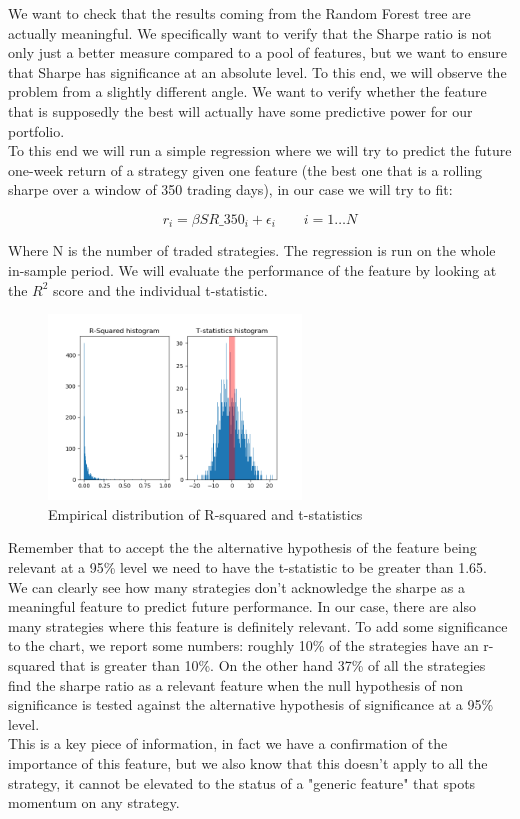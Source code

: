 We want to check that the results coming from the Random Forest tree are actually meaningful. We specifically want to verify that the Sharpe ratio is not only just a better measure compared to a pool of features, but we want to ensure that Sharpe has significance at an absolute level. To this end, we will observe the problem from a slightly different angle. We want to verify whether the feature that is supposedly the best will actually have some predictive power for our portfolio.\\
To this end we will run a simple regression where we will try to predict the future one-week return of a strategy given one feature (the best one that is a rolling sharpe over a window of 350 trading days), in our case we will try to fit:

\begin{equation} \label{regression}
r_i = \beta SR\_350_i + \epsilon_i \qquad i=1\dots N
\end{equation}

Where N is the number of traded strategies. The regression is run on the whole in-sample period. We will evaluate the performance of the feature by looking at the $R^2$ score and the individual t-statistic.

\begin{figure}[htbp]
	\centering
	\includegraphics[width=0.6\textwidth]{Part_1/histograms.png}
	\caption{Empirical distribution of R-squared and t-statistics}
	\label{histograms}
\end{figure}

Remember that to accept the the alternative hypothesis of the feature being relevant at a 95\% level we need to have the t-statistic to be greater than 1.65.\\
We can clearly see how many strategies don't acknowledge the sharpe as a meaningful feature to predict future performance. In our case, there are also many strategies where this feature is definitely relevant. To add some significance to the chart, we report some numbers: 
roughly 10\% of the strategies have an r-squared that is greater than 10\%. On the other hand 37\% of all the strategies find the sharpe ratio as a relevant feature when the null hypothesis of non significance is tested against the alternative hypothesis of significance at a 95\% level.\\
This is a key piece of information, in fact we have a confirmation of the importance of this feature, but we also know that this doesn't apply to all the strategy, it cannot be elevated to the status of a "generic feature" that spots momentum on any strategy. 